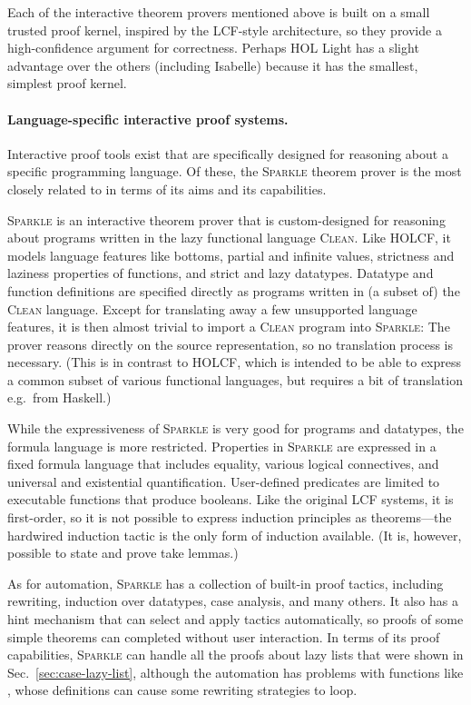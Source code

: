 Each of the interactive theorem provers mentioned above is built on a small trusted proof kernel, inspired by the LCF-style architecture, so they provide a high-confidence argument for correctness. Perhaps HOL Light has a slight advantage over the others (including Isabelle) because it has the smallest, simplest proof kernel.

\paragraph{Language-specific interactive proof systems.}

Interactive proof tools exist that are specifically designed for reasoning about a specific programming language. Of these, the \textsc{Sparkle} theorem prover \cite{Mol01} is the most closely related to  in terms of its aims and its capabilities.

\textsc{Sparkle} is an interactive theorem prover that is custom-designed for reasoning about programs written in the lazy functional language \textsc{Clean}. Like HOLCF, it models language features like bottoms, partial and infinite values, strictness and laziness properties of functions, and strict and lazy datatypes. Datatype and function definitions are specified directly as programs written in (a subset of) the \textsc{Clean} language. Except for translating away a few unsupported language features, it is then almost trivial to import a \textsc{Clean} program into \textsc{Sparkle}: The prover reasons directly on the source representation, so no translation process is necessary. (This is in contrast to HOLCF, which is intended to be able to express a common subset of various functional languages, but requires a bit of translation e.g.\ from Haskell.)

While the expressiveness of \textsc{Sparkle} is very good for programs and datatypes, the formula language is more restricted. Properties in \textsc{Sparkle} are expressed in a fixed formula language that includes equality, various logical connectives, and universal and existential quantification. User-defined predicates are limited to executable functions that produce booleans. Like the original LCF systems, it is first-order, so it is not possible to express induction principles as theorems---the hardwired induction tactic is the only form of induction available. (It is, however, possible to state and prove take lemmas.)

As for automation, \textsc{Sparkle} has a collection of built-in proof tactics, including rewriting, induction over datatypes, case analysis, and many others. It also has a hint mechanism that can select and apply tactics automatically, so proofs of some simple theorems can completed without user interaction. In terms of its proof capabilities, \textsc{Sparkle} can handle all the proofs about lazy lists that were shown in Sec.~\ref{sec:case-lazy-list}, although the automation has problems with functions like , whose definitions can cause some rewriting strategies to loop.

